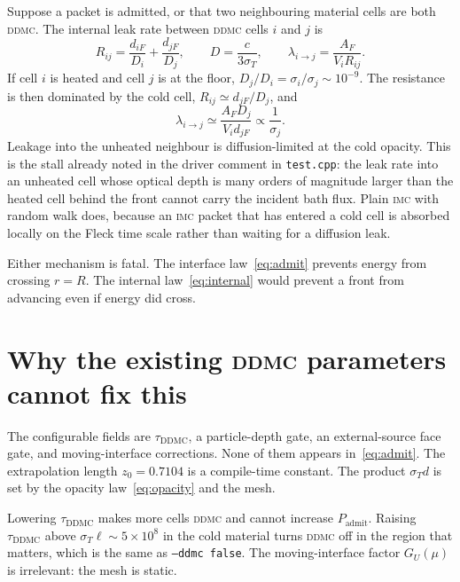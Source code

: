 \documentclass[11pt]{article}
\newcommand{\imc}{\textsc{imc}}
\newcommand{\ddmc}{\textsc{ddmc}}
\begin{document}
Suppose a packet is admitted, or that two neighbouring material cells are both \ddmc{}.
The internal leak rate between \ddmc{} cells $i$ and $j$ is~\cite{densmore2012}
\begin{equation}
  R_{ij}
  =
  \frac{d_{iF}}{D_i}+\frac{d_{jF}}{D_j},
  \qquad
  D=\frac{c}{3\sigma_T},
  \qquad
  \lambda_{i\to j}
  =
  \frac{A_F}{V_i R_{ij}}.
  \label{eq:internal}
\end{equation}
If cell $i$ is heated and cell $j$ is at the floor, $D_j/D_i=\sigma_i/\sigma_j\sim 10^{-9}$.
The resistance is then dominated by the cold cell, $R_{ij}\simeq d_{jF}/D_j$, and
\begin{equation}
  \lambda_{i\to j}
  \simeq
  \frac{A_F D_j}{V_i d_{jF}}
  \propto
  \frac{1}{\sigma_j}.
\end{equation}
Leakage into the unheated neighbour is diffusion-limited at the cold opacity.
This is the stall already noted in the driver comment in \texttt{test.cpp}:
the leak rate into an unheated cell whose optical depth is many orders of magnitude larger than the heated cell behind the front cannot carry the incident bath flux.
Plain \imc{} with random walk does, because an \imc{} packet that has entered a cold cell is absorbed locally on the Fleck time scale rather than waiting for a diffusion leak.

Either mechanism is fatal.
The interface law~\eqref{eq:admit} prevents energy from crossing $r=R$.
The internal law~\eqref{eq:internal} would prevent a front from advancing even if energy did cross.

\section{Why the existing \ddmc{} parameters cannot fix this}

The configurable fields are $\tau_{\mathrm{DDMC}}$, a particle-depth gate, an external-source face gate, and moving-interface corrections.
None of them appears in~\eqref{eq:admit}.
The extrapolation length $z_0=0.7104$ is a compile-time constant.
The product $\sigma_T d$ is set by the opacity law~\eqref{eq:opacity} and the mesh.

Lowering $\tau_{\mathrm{DDMC}}$ makes more cells \ddmc{} and cannot increase $P_{\mathrm{admit}}$.
Raising $\tau_{\mathrm{DDMC}}$ above $\sigma_T\ell\sim 5\times 10^{8}$ in the cold material turns \ddmc{} off in the region that matters, which is the same as \texttt{--ddmc false}.
The moving-interface factor $G_U(\mu)$ is irrelevant: the mesh is static.
\end{document}
